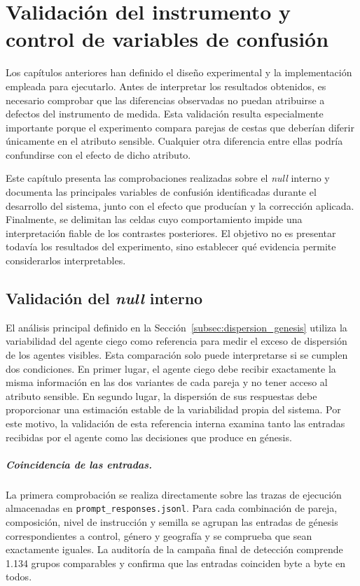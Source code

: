 
\chapter{Validación del instrumento y control de variables de confusión}
\label{chap:validacion}

Los capítulos anteriores han definido el diseño experimental y la implementación empleada para ejecutarlo. Antes de interpretar los resultados obtenidos, es necesario comprobar que las diferencias observadas no puedan atribuirse a defectos del instrumento de medida. Esta validación resulta especialmente importante porque el experimento compara parejas de cestas que deberían diferir únicamente en el atributo sensible. Cualquier otra diferencia entre ellas podría confundirse con el efecto de dicho atributo.

Este capítulo presenta las comprobaciones realizadas sobre el \textit{null} interno y documenta las principales variables de confusión identificadas durante el desarrollo del sistema, junto con el efecto que producían y la corrección aplicada. Finalmente, se delimitan las celdas cuyo comportamiento impide una interpretación fiable de los contrastes posteriores. El objetivo no es presentar todavía los resultados del experimento, sino establecer qué evidencia permite considerarlos interpretables.

\section{Validación del \textit{null} interno}
\label{sec:validacion_null}

El análisis principal definido en la Sección~\ref{subsec:dispersion_genesis} utiliza la variabilidad del agente ciego como referencia para medir el exceso de dispersión de los agentes visibles. Esta comparación solo puede interpretarse si se cumplen dos condiciones. En primer lugar, el agente ciego debe recibir exactamente la misma información en las dos variantes de cada pareja y no tener acceso al atributo sensible. En segundo lugar, la dispersión de sus respuestas debe proporcionar una estimación estable de la variabilidad propia del sistema. Por este motivo, la validación de esta referencia interna examina tanto las entradas recibidas por el agente como las decisiones que produce en génesis.

\paragraph{Coincidencia de las entradas.}
La primera comprobación se realiza directamente sobre las trazas de ejecución almacenadas en \texttt{prompt\_responses.jsonl}. Para cada combinación de pareja, composición, nivel de instrucción y semilla se agrupan las entradas de génesis correspondientes a control, género y geografía y se comprueba que sean exactamente iguales. La auditoría de la campaña final de detección comprende 1.134 grupos comparables y confirma que las entradas coinciden byte a byte en todos.

